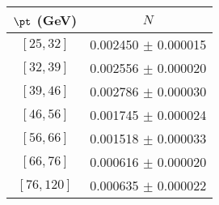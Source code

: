 \begin{tabular}{c||c}
$\pt$ (GeV) & $N$  \\
\hline
$[25, 32]$ & 0.002450 $\pm$ 0.000015\\
$[32, 39]$ & 0.002556 $\pm$ 0.000020\\
$[39, 46]$ & 0.002786 $\pm$ 0.000030\\
$[46, 56]$ & 0.001745 $\pm$ 0.000024\\
$[56, 66]$ & 0.001518 $\pm$ 0.000033\\
$[66, 76]$ & 0.000616 $\pm$ 0.000020\\
$[76, 120]$ & 0.000635 $\pm$ 0.000022\\
\end{tabular}
